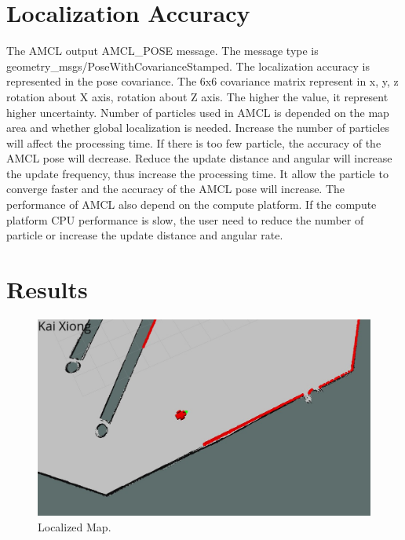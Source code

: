 \documentclass[10pt,journal,compsoc]{IEEEtran}
\begin{document}
\section{Localization Accuracy}
The AMCL output AMCL\_POSE message. The message type is geometry\_msgs/PoseWithCovarianceStamped. The localization accuracy is represented in the pose covariance. The 6x6 covariance matrix represent in x, y, z rotation about X axis, rotation about Z axis. The higher the value, it represent higher uncertainty.
Number of particles used in AMCL is depended on the map area and whether global localization is needed. Increase the number of particles will affect the processing time. If there is too few particle, the accuracy of the AMCL pose will decrease.
Reduce the update distance and angular will increase the update frequency, thus increase the processing time. It allow the particle to converge faster and the accuracy of the AMCL pose will increase.
The performance of AMCL also depend on the compute platform. If the compute platform CPU performance is slow, the user need to reduce the number of particle or increase the update distance and angular rate.

\section{Results}

\begin{figure}[thpb]
      \centering
      \includegraphics[width=\linewidth]{AMCL.jpg}
      \caption{Localized Map.}
      \label{fig:robot3}
\end{figure}
\end{document}
